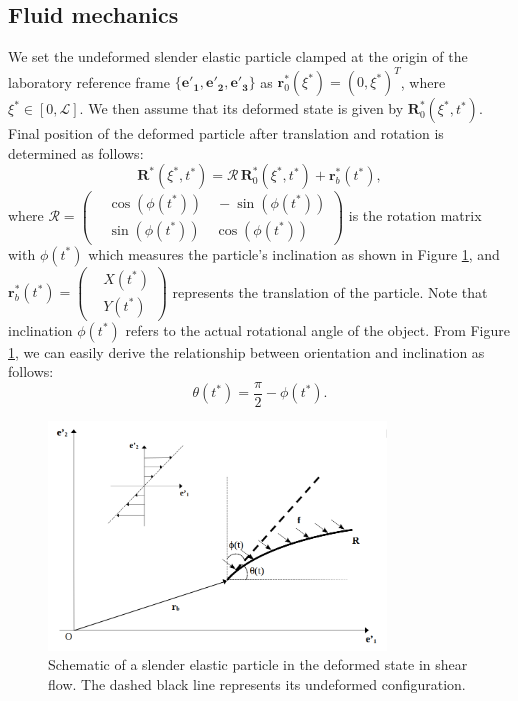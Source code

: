 \documentclass[a4paper,12pt]{report}
\begin{document}
\subsection{Fluid mechanics}
We set the undeformed slender elastic particle clamped at the origin of the laboratory reference frame $\{\mathbf{e'_1}, \mathbf{e'_2}, \mathbf{e'_3}\}$ as
$\mathbf{r}_0^*(\xi^*)=(0,\xi^*)^T$, where $\xi^*\in [0,\mathcal{L}]$. We then assume that its deformed state is given by $\mathbf{R}_0^*(\xi^*,t^*)$. 
Final position of the deformed particle after translation and rotation is determined as follows:
\begin{equation}
	\label{eqn:19}
	\mathbf{R}^*(\xi^*,t^*)=\bm{\mathcal{R}}\,\mathbf{R}_0^*(\xi^*,t^*)+\mathbf{r}_b^*(t^*),
\end{equation}
where $\bm{\mathcal{R}}=\left(\begin{aligned}
	&\cos(\phi(t^*))\quad -\sin(\phi(t^*)) \\
	&\sin(\phi(t^*))\quad \cos(\phi(t^*))
\end{aligned}\right)$ is the rotation matrix with $\phi(t^*)$ which measures the particle's inclination as shown in Figure \ref{fig:5}, and $\textbf{r}_b^*(t^*)=\left(\begin{aligned}
&X(t^*) \\
&Y(t^*)
\end{aligned}\right)$ represents the translation of the particle. Note that inclination $\phi(t^*)$ refers to the actual rotational angle of the object. From Figure \ref{fig:5}, we can easily derive the relationship between orientation and inclination as follows:
\begin{equation}
	\label{eqn:20}
	\theta(t^*)=\frac{\pi}{2}-\phi(t^*).
\end{equation}
\begin{figure}[htb]
	\begin{center}
		\includegraphics[width=0.8\textwidth]{plot/fluid_general.png}
		\caption{Schematic of a slender elastic particle in the deformed state in shear flow. The dashed black line represents its undeformed configuration.}
		\label{fig:5}
	\end{center}
\end{figure}
\end{document}
